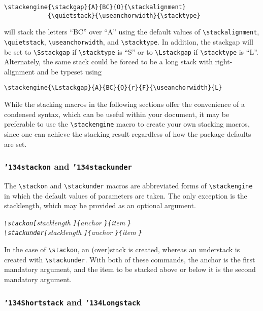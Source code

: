 \documentclass{article}
\let\vb\verb
\newcommand\cmd[1]{\texttt{\char'134#1}}
\begin{document}
\begin{verbatim}
\stackengine{\stackgap}{A}{BC}{O}{\stackalignment}
            {\quietstack}{\useanchorwidth}{\stacktype}
\end{verbatim}

will stack the letters ``BC'' over ``A'' using the default values of
\vb|\stackalignment|, \vb|\quietstack|, \vb|\useanchorwidth|,
and \vb|\stacktype|.  In addition, the stackgap will be set to
\vb|\Sstackgap| if \vb|\stacktype| is ``S'' or to \vb|\Lstackgap|
if \vb|\stacktype| is ``L''.  Alternately, the  same stack could be 
forced to be a long stack with right-alignment and be typeset using

\begin{verbatim}
\stackengine{\Lstackgap}{A}{BC}{O}{r}{F}{\useanchorwidth}{L}
\end{verbatim}
\vspace{-0.8ex}

While the stacking macros in the following sections offer the convenience 
of a condensed syntax, which can be useful within your document, it may be
preferable to use the \vb|\stackengine| macro to create your own
stacking macros, since one can achieve the stacking result regardless of 
how the package defaults are set.

\subsubsection{\cmd{stackon} and \cmd{stackunder}\label{s:sou}}

The \vb|\stackon| and \vb|\stackunder| macros are abbreviated forms
of \vb|\stackengine| in which the default values of parameters are
taken.  The only exception is the stacklength, which may be provided as
an optional argument.

\itshape
\vb|\stackon[|stacklength%
  \vb|]{|anchor%
  \vb|}{|item%
  \vb|}|\\
\vb|\stackunder[|stacklength%
  \vb|]{|anchor%
  \vb|}{|item%
  \vb|}|
\upshape

In the case of \vb|\stackon|, an (over)stack is created, whereas an
understack is created with \vb|\stackunder|.  With both of these
commands, the anchor is the first mandatory argument, and the item to be
stacked above or below it is the second mandatory argument.\vspace{-0.8ex}

\subsubsection{\cmd{Shortstack} and \cmd{Longstack}\label{s:sls}}
\end{document}
